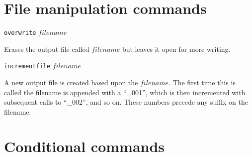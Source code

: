 \documentclass {scrbook}
\newcommand {\ttt} {\texttt}
\begin{document}
\section{File manipulation commands}

\begin{description}

\item{\ttt{overwrite} $filename$}

Erases the output file called $filename$ but leaves it open for more writing.

\item{\ttt{incrementfile} $filename$}

A new output file is created based upon the $filename$. The first time this is called the filename is appended with a ``\_001'', which is then incremented with subsequent calls to ``\_002'', and so on. These numbers precede any suffix on the filename.

\end{description}

\section{Conditional commands}
\end{document}
